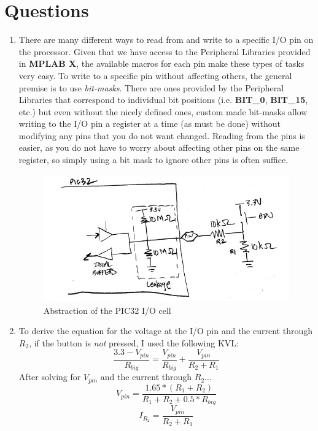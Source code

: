 \documentclass[a4paper, 12pt]{article}
\begin{document}
\section{Questions}
\begin{enumerate}
\item There are many different ways to read from and write to a specific I/O pin on the processor. Given that we have access to the Peripheral Libraries provided in \textbf{MPLAB X}, the available macros for each pin make these types of tasks very easy. To write to a specific pin without affecting others, the general premise is to use \textit{bit-masks}. There are ones provided by the Peripheral Libraries that correspond to individual bit positions (i.e. \textbf{BIT\_0}, \textbf{BIT\_15}, etc.) but even without the nicely defined ones, custom made bit-masks allow writing to the I/O pin a register at a time (as must be done) without modifying any pins that you do not want changed. Reading from the pins is easier, as you do not have to worry about affecting other pins on the same register, so simply using a bit mask to ignore other pins is often suffice.

\begin{figure}[h]
\centering
\includegraphics[width=1\textwidth]{Schematic}
\caption{Abstraction of the PIC32 I/O cell}
\end{figure}

\newpage
\item To derive the equation for the voltage at the I/O pin and the current through $R_2$, if the button is \textit{not} pressed, I used the following KVL:
$$\frac{3.3-V_{pin}}{R_{big}}=\frac{V_{pin}}{R_{big}}+\frac{V_{pin}}{R_2+R_1}$$
After solving for \textit{$V_{pin}$} and the current through $R_2$...
\begin{equation}V_{pin}=\frac{1.65*(R_1+R_2)}{R_1+R_2+0.5*R_{big}}\end{equation}
\begin{equation}I_{R_2}=\frac{V_{pin}}{R_2+R_1}\end{equation}


\end{enumerate}
\end{document}
